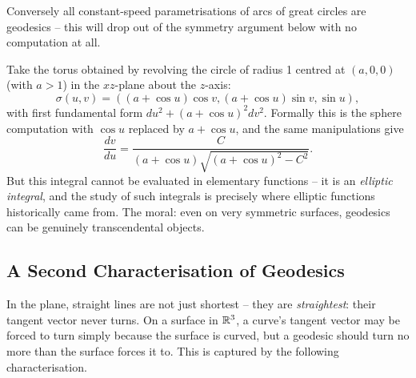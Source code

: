\documentclass[a4paper]{scrartcl}
\begin{document}
\begin{example}
\begin{center}
    \end{center}
    Conversely all constant-speed parametrisations of arcs of great circles are geodesics -- this will drop out of the symmetry argument below with no computation at all.
\end{example}

\begin{example}
    Take the torus obtained by revolving the circle of radius 1 centred at $(a, 0, 0)$ (with $a > 1$) in the $xz$-plane about the $z$-axis:
    $$
    \sigma(u, v) = ((a + \cos u)\cos v, (a + \cos u)\sin v, \sin u),
    $$
    with first fundamental form $du^2 + (a + \cos u)^2 dv^2$. Formally this is the sphere computation with $\cos u$ replaced by $a + \cos u$, and the same manipulations give
    $$
    \frac{dv}{du} = \frac{C}{(a + \cos u)\sqrt{(a + \cos u)^2 - C^2}}.
    $$
    But this integral cannot be evaluated in elementary functions -- it is an \emph{elliptic integral}, and the study of such integrals is precisely where elliptic functions historically came from. The moral: even on very symmetric surfaces, geodesics can be genuinely transcendental objects.
\end{example}

\subsection{A Second Characterisation of Geodesics}

In the plane, straight lines are not just shortest -- they are \emph{straightest}: their tangent vector never turns. On a surface in $\mathbb{R}^3$, a curve's tangent vector may be forced to turn simply because the surface is curved, but a geodesic should turn no more than the surface forces it to. This is captured by the following characterisation.
\end{document}
